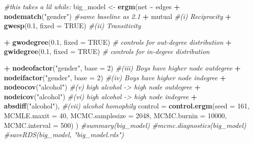 \documentclass[
]{article}
\newenvironment{Shaded}{\begin{snugshade}}{\end{snugshade}}
\newcommand{\AttributeTok}[1]{\textcolor[rgb]{0.13,0.29,0.53}{#1}}
\newcommand{\CommentTok}[1]{\textcolor[rgb]{0.56,0.35,0.01}{\textit{#1}}}
\newcommand{\ConstantTok}[1]{\textcolor[rgb]{0.56,0.35,0.01}{#1}}
\newcommand{\DecValTok}[1]{\textcolor[rgb]{0.00,0.00,0.81}{#1}}
\newcommand{\FloatTok}[1]{\textcolor[rgb]{0.00,0.00,0.81}{#1}}
\newcommand{\FunctionTok}[1]{\textcolor[rgb]{0.13,0.29,0.53}{\textbf{#1}}}
\newcommand{\NormalTok}[1]{#1}
\newcommand{\OtherTok}[1]{\textcolor[rgb]{0.56,0.35,0.01}{#1}}
\newcommand{\SpecialCharTok}[1]{\textcolor[rgb]{0.81,0.36,0.00}{\textbf{#1}}}
\newcommand{\StringTok}[1]{\textcolor[rgb]{0.31,0.60,0.02}{#1}}
\begin{document}
\begin{Shaded}
\begin{Highlighting}[]
\CommentTok{\#this takes a lil while:}
\NormalTok{big\_model }\OtherTok{\textless{}{-}} \FunctionTok{ergm}\NormalTok{(net }\SpecialCharTok{\textasciitilde{}}\NormalTok{ edges }\SpecialCharTok{+} \FunctionTok{nodematch}\NormalTok{(}\StringTok{"gender"}\NormalTok{) }\CommentTok{\#same baseline as 2.1}
               \SpecialCharTok{+}\NormalTok{ mutual }\CommentTok{\#(i) Reciprocity}
               \SpecialCharTok{+} \FunctionTok{gwesp}\NormalTok{(}\FloatTok{0.1}\NormalTok{, }\AttributeTok{fixed =} \ConstantTok{TRUE}\NormalTok{) }\CommentTok{\#(ii) Transitivity}
               
               \SpecialCharTok{+} \FunctionTok{gwodegree}\NormalTok{(}\FloatTok{0.1}\NormalTok{, }\AttributeTok{fixed =} \ConstantTok{TRUE}\NormalTok{)    }\CommentTok{\# controls for out{-}degree distribution}
               \SpecialCharTok{+} \FunctionTok{gwidegree}\NormalTok{(}\FloatTok{0.1}\NormalTok{, }\AttributeTok{fixed =} \ConstantTok{TRUE}\NormalTok{)    }\CommentTok{\# controls for in{-}degree distribution}
               
               \SpecialCharTok{+} \FunctionTok{nodeofactor}\NormalTok{(}\StringTok{"gender"}\NormalTok{, }\AttributeTok{base =} \DecValTok{2}\NormalTok{) }\CommentTok{\#(iii) Boys have higher node outdegree}
               \SpecialCharTok{+} \FunctionTok{nodeifactor}\NormalTok{(}\StringTok{"gender"}\NormalTok{, }\AttributeTok{base =} \DecValTok{2}\NormalTok{) }\CommentTok{\#(iv) Boys have higher node indegree}
               \SpecialCharTok{+} \FunctionTok{nodeocov}\NormalTok{(}\StringTok{"alcohol"}\NormalTok{) }\CommentTok{\#(v) high alcohol {-}\textgreater{} high node outdegree}
               \SpecialCharTok{+} \FunctionTok{nodeicov}\NormalTok{(}\StringTok{"alcohol"}\NormalTok{) }\CommentTok{\#(vi) high alcohol {-}\textgreater{} high node indegree}
               \SpecialCharTok{+} \FunctionTok{absdiff}\NormalTok{(}\StringTok{"alcohol"}\NormalTok{), }\CommentTok{\#(vii) alcohol homophily}
               \AttributeTok{control =} \FunctionTok{control.ergm}\NormalTok{(}\AttributeTok{seed =} \DecValTok{161}\NormalTok{, }\AttributeTok{MCMLE.maxit =} \DecValTok{40}\NormalTok{, }\AttributeTok{MCMC.samplesize =} \DecValTok{2048}\NormalTok{, }
                \AttributeTok{MCMC.burnin =} \DecValTok{10000}\NormalTok{, }\AttributeTok{MCMC.interval =} \DecValTok{500}\NormalTok{)}
\NormalTok{               )}
\CommentTok{\#summary(big\_model)}
\CommentTok{\#mcmc.diagnostics(big\_model)}
\CommentTok{\#saveRDS(big\_model, "big\_model.rds")}


\end{Highlighting}
\end{Shaded}
\end{document}

